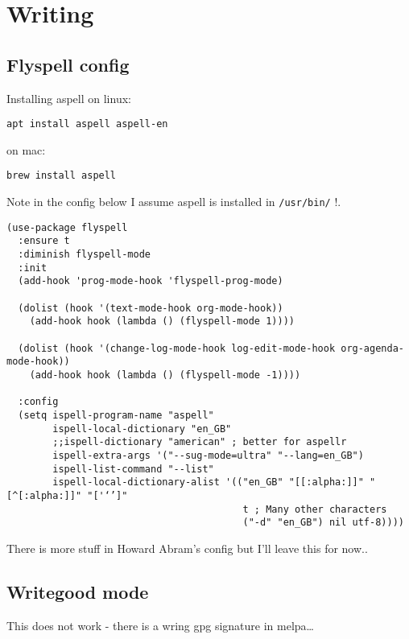 \documentclass[12pt]{article}
\begin{document}
\section{Writing}
\label{sec:orgafea673}

\subsection{Flyspell config}
\label{sec:orgd3fdf17}

Installing aspell on linux:

\begin{verbatim}
apt install aspell aspell-en
\end{verbatim}

on mac: 

\begin{verbatim}
brew install aspell 
\end{verbatim}

Note in the config below I assume aspell is installed in \texttt{/usr/bin/} !. 

\begin{verbatim}
(use-package flyspell
  :ensure t
  :diminish flyspell-mode
  :init
  (add-hook 'prog-mode-hook 'flyspell-prog-mode)

  (dolist (hook '(text-mode-hook org-mode-hook))
    (add-hook hook (lambda () (flyspell-mode 1))))

  (dolist (hook '(change-log-mode-hook log-edit-mode-hook org-agenda-mode-hook))
    (add-hook hook (lambda () (flyspell-mode -1))))

  :config
  (setq ispell-program-name "aspell"
        ispell-local-dictionary "en_GB"
        ;;ispell-dictionary "american" ; better for aspellr
        ispell-extra-args '("--sug-mode=ultra" "--lang=en_GB")
        ispell-list-command "--list"
        ispell-local-dictionary-alist '(("en_GB" "[[:alpha:]]" "[^[:alpha:]]" "['‘’]"
                                         t ; Many other characters
                                         ("-d" "en_GB") nil utf-8))))

\end{verbatim}

There is more stuff in Howard Abram's config but I'll leave this for now..



\subsection{Writegood mode}
\label{sec:org2be6598}
This does not work - there is a wring gpg signature in melpa\ldots{} 
\end{document}
